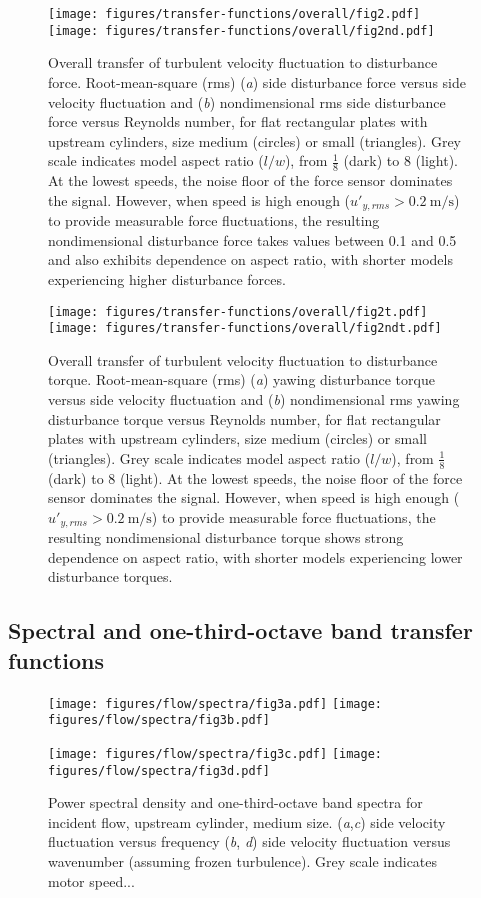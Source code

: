 \documentclass{jfm}
\begin{document}
\begin{figure} 
\centerline{\texttt{[image: figures/transfer-functions/overall/fig2.pdf]}%
\texttt{[image: figures/transfer-functions/overall/fig2nd.pdf]}}
\caption{Overall transfer of turbulent velocity fluctuation to disturbance force.  Root-mean-square (rms) (\textit{a}) side disturbance force versus side velocity fluctuation and (\textit{b}) nondimensional rms side disturbance force versus Reynolds number, for flat rectangular plates with upstream cylinders, size medium (circles) or small (triangles).  Grey scale indicates model aspect ratio ($l/w$), from $\frac{1}{8}$ (dark) to \num{8} (light).  At the lowest speeds, the noise floor of the force sensor dominates the signal.  However, when speed is high enough ($u'_{y,rms}>\SI{0.2}{\meter\per\second}$) to provide measurable force fluctuations, the resulting nondimensional disturbance force takes values between \num{0.1} and \num{0.5} and also exhibits dependence on aspect ratio, with shorter models experiencing higher disturbance forces. }
\label{fig:overallfluctuations}
\end{figure}

\begin{figure} 
\centerline{\texttt{[image: figures/transfer-functions/overall/fig2t.pdf]}%
\texttt{[image: figures/transfer-functions/overall/fig2ndt.pdf]}}
\caption{Overall transfer of turbulent velocity fluctuation to disturbance torque.  Root-mean-square (rms) (\textit{a}) yawing disturbance torque versus side velocity fluctuation and (\textit{b}) nondimensional rms yawing disturbance torque versus Reynolds number, for flat rectangular plates with upstream cylinders, size medium (circles) or small (triangles).  Grey scale indicates model aspect ratio ($l/w$), from $\frac{1}{8}$ (dark) to \num{8} (light).  At the lowest speeds, the noise floor of the force sensor dominates the signal.  However, when speed is high enough ($u'_{y,rms}>\SI{0.2}{\meter\per\second}$) to provide measurable force fluctuations, the resulting nondimensional disturbance torque shows strong dependence on aspect ratio, with shorter models experiencing lower disturbance torques. }
\label{fig:overallfluctuations}
\end{figure}

\subsection{Spectral and one-third-octave band transfer functions}

\begin{figure} 
\centerline{\texttt{[image: figures/flow/spectra/fig3a.pdf]}%
\texttt{[image: figures/flow/spectra/fig3b.pdf]}}
\centerline{\texttt{[image: figures/flow/spectra/fig3c.pdf]}%
\texttt{[image: figures/flow/spectra/fig3d.pdf]}}
\caption{Power spectral density and one-third-octave band spectra for incident flow, upstream cylinder, medium size. (\textit{a},\textit{c}) side velocity fluctuation versus frequency (\textit{b}, \textit{d}) side velocity fluctuation versus wavenumber (assuming frozen turbulence).  Grey scale indicates motor speed... }
\label{fig:exampleflowspectra}
\end{figure}
\end{document}
